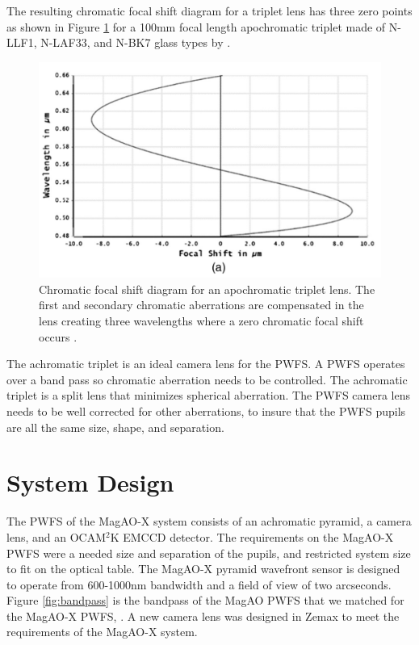 The resulting chromatic focal shift diagram for a triplet lens has three zero points as shown in Figure \ref{fig:apochromat} for a 100mm focal length apochromatic triplet made of N-LLF1, N-LAF33, and N-BK7 glass types by \cite{sasian2017method}. 

\begin{figure}
    \centering
    \includegraphics[width=.6\textwidth]{Chapter Materials/Chapter Three Materials/tripleapochromat.PNG}
    \caption{Chromatic focal shift diagram for an apochromatic triplet lens. The first and secondary chromatic aberrations are compensated in the lens creating three wavelengths where a zero chromatic focal shift occurs \citep{sasian2017method}.}
    \label{fig:apochromat}
\end{figure}

The achromatic triplet is an ideal camera lens for the PWFS. A PWFS operates over a band pass so chromatic aberration needs to be controlled. The achromatic triplet is a split lens that minimizes spherical aberration. The PWFS camera lens needs to be well corrected for other aberrations, to insure that the PWFS pupils are all the same size, shape, and separation. 



\section{System Design}

The PWFS of the MagAO-X system consists of an achromatic pyramid, a camera lens, and an OCAM$^2$K EMCCD detector. The requirements on the MagAO-X PWFS were a needed size and separation of the pupils, and restricted system size to fit on the optical table. The MagAO-X pyramid wavefront sensor is designed to operate from 600-1000nm bandwidth and a field of view of two arcseconds. Figure \ref{fig:bandpass} is the bandpass of the MagAO PWFS that we matched for the MagAO-X PWFS, \citep{morzinski2014magao}. A new camera lens was designed in Zemax to meet the requirements of the MagAO-X system. 
	
